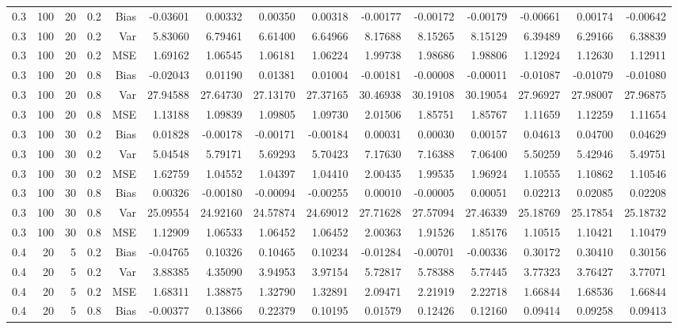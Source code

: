 \begin{table}[!htbp]
\begin{tabular}{lrrrrrrrrrrrrrr}
0.3 & 100 & 20 & 0.2 & Bias & -0.03601 & 0.00332 & 0.00350 & 0.00318 & -0.00177 & -0.00172 & -0.00179 & -0.00661 & 0.00174 & -0.00642 \\
0.3 & 100 & 20 & 0.2 & Var & 5.83060 & 6.79461 & 6.61400 & 6.64966 & 8.17688 & 8.15265 & 8.15129 & 6.39489 & 6.29166 & 6.38839 \\
0.3 & 100 & 20 & 0.2 & MSE & 1.69162 & 1.06545 & 1.06181 & 1.06224 & 1.99738 & 1.98686 & 1.98806 & 1.12924 & 1.12630 & 1.12911 \\
0.3 & 100 & 20 & 0.8 & Bias & -0.02043 & 0.01190 & 0.01381 & 0.01004 & -0.00181 & -0.00008 & -0.00011 & -0.01087 & -0.01079 & -0.01080 \\
0.3 & 100 & 20 & 0.8 & Var & 27.94588 & 27.64730 & 27.13170 & 27.37165 & 30.46938 & 30.19108 & 30.19054 & 27.96927 & 27.98007 & 27.96875 \\
0.3 & 100 & 20 & 0.8 & MSE & 1.13188 & 1.09839 & 1.09805 & 1.09730 & 2.01506 & 1.85751 & 1.85767 & 1.11659 & 1.12259 & 1.11654 \\
0.3 & 100 & 30 & 0.2 & Bias & 0.01828 & -0.00178 & -0.00171 & -0.00184 & 0.00031 & 0.00030 & 0.00157 & 0.04613 & 0.04700 & 0.04629 \\
0.3 & 100 & 30 & 0.2 & Var & 5.04548 & 5.79171 & 5.69293 & 5.70423 & 7.17630 & 7.16388 & 7.06400 & 5.50259 & 5.42946 & 5.49751 \\
0.3 & 100 & 30 & 0.2 & MSE & 1.62759 & 1.04552 & 1.04397 & 1.04410 & 2.00435 & 1.99535 & 1.96924 & 1.10555 & 1.10862 & 1.10546 \\
0.3 & 100 & 30 & 0.8 & Bias & 0.00326 & -0.00180 & -0.00094 & -0.00255 & 0.00010 & -0.00005 & 0.00051 & 0.02213 & 0.02085 & 0.02208 \\
0.3 & 100 & 30 & 0.8 & Var & 25.09554 & 24.92160 & 24.57874 & 24.69012 & 27.71628 & 27.57094 & 27.46339 & 25.18769 & 25.17854 & 25.18732 \\
0.3 & 100 & 30 & 0.8 & MSE & 1.12909 & 1.06533 & 1.06452 & 1.06452 & 2.00363 & 1.91526 & 1.85176 & 1.10515 & 1.10421 & 1.10479 \\
0.4 &  20 &  5 & 0.2 & Bias & -0.04765 & 0.10326 & 0.10465 & 0.10234 & -0.01284 & -0.00701 & -0.00336 & 0.30172 & 0.30410 & 0.30156 \\
0.4 &  20 &  5 & 0.2 & Var & 3.88385 & 4.35090 & 3.94953 & 3.97154 & 5.72817 & 5.78388 & 5.77445 & 3.77323 & 3.76427 & 3.77071 \\
0.4 &  20 &  5 & 0.2 & MSE & 1.68311 & 1.38875 & 1.32790 & 1.32891 & 2.09471 & 2.21919 & 2.22718 & 1.66844 & 1.68536 & 1.66844 \\
0.4 &  20 &  5 & 0.8 & Bias & -0.00377 & 0.13866 & 0.22379 & 0.10195 & 0.01579 & 0.12426 & 0.12160 & 0.09414 & 0.09258 & 0.09413 \\

\end{tabular}
\end{table}
